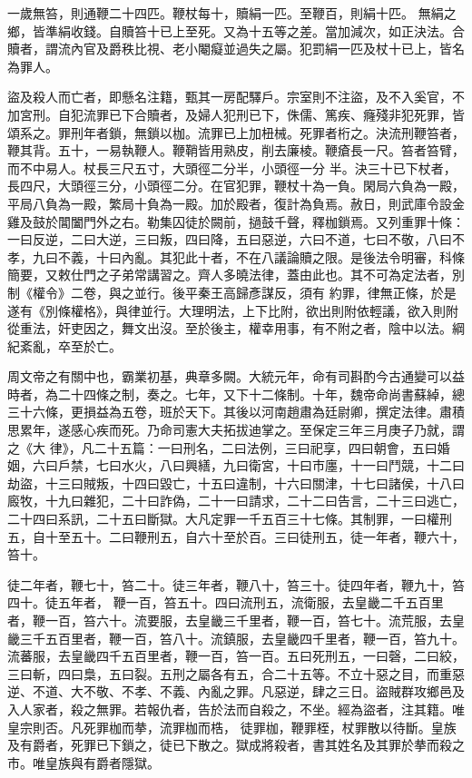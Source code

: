 \begin{pinyinscope}
 一歲無笞，則通鞭二十四匹。鞭杖每十，贖絹一匹。至鞭百，則絹十匹。
 無絹之鄉，皆準絹收錢。自贖笞十已上至死。又為十五等之差。當加減次，如正決法。合贖者，謂流內官及爵秩比視、老小閹癡並過失之屬。犯罰絹一匹及杖十已上，皆名為罪人。



 盜及殺人而亡者，即懸名注籍，甄其一房配驛戶。宗室則不注盜，及不入奚官，不加宮刑。自犯流罪已下合贖者，及婦人犯刑已下，侏儒、篤疾、癃殘非犯死罪，皆頌系之。罪刑年者鎖，無鎖以枷。流罪已上加杻械。死罪者桁之。決流刑鞭笞者，鞭其背。五十，一易執鞭人。鞭鞘皆用熟皮，削去廉棱。鞭瘡長一尺。笞者笞臂，而不中易人。杖長三尺五寸，大頭徑二分半，小頭徑一分
 半。決三十已下杖者，長四尺，大頭徑三分，小頭徑二分。在官犯罪，鞭杖十為一負。閑局六負為一殿，平局八負為一殿，繁局十負為一殿。加於殿者，復計為負焉。赦日，則武庫令設金雞及鼓於閶闔門外之右。勒集囚徒於闕前，撾鼓千聲，釋枷鎖焉。又列重罪十條：一曰反逆，二曰大逆，三曰叛，四曰降，五曰惡逆，六曰不道，七曰不敬，八曰不孝，九曰不義，十曰內亂。其犯此十者，不在八議論贖之限。是後法令明審，科條簡要，又敕仕門之子弟常講習之。齊人多曉法律，蓋由此也。其不可為定法者，別制《權令》二卷，與之並行。後平秦王高歸彥謀反，須有
 約罪，律無正條，於是遂有《別條權格》，與律並行。大理明法，上下比附，欲出則附依輕議，欲入則附從重法，奸吏因之，舞文出沒。至於後主，權幸用事，有不附之者，陰中以法。綱紀紊亂，卒至於亡。



 周文帝之有關中也，霸業初基，典章多闕。大統元年，命有司斟酌今古通變可以益時者，為二十四條之制，奏之。七年，又下十二條制。十年，魏帝命尚書蘇綽，總三十六條，更損益為五卷，班於天下。其後以河南趙肅為廷尉卿，撰定法律。肅積思累年，遂感心疾而死。乃命司憲大夫拓拔迪掌之。至保定三年三月庚子乃就，謂之《大
 律》，凡二十五篇：一曰刑名，二曰法例，三曰祀享，四曰朝會，五曰婚姻，六曰戶禁，七曰水火，八曰興繕，九曰衛宮，十曰市廛，十一曰鬥競，十二曰劫盜，十三曰賊叛，十四曰毀亡，十五曰違制，十六曰關津，十七曰諸侯，十八曰廄牧，十九曰雜犯，二十曰詐偽，二十一曰請求，二十二曰告言，二十三曰逃亡，二十四曰系訊，二十五曰斷獄。大凡定罪一千五百三十七條。其制罪，一曰權刑五，自十至五十。二曰鞭刑五，自六十至於百。三曰徒刑五，徒一年者，鞭六十，笞十。



 徒二年者，鞭七十，笞二十。徒三年者，鞭八十，笞三十。徒四年者，鞭九十，笞四十。徒五年者，
 鞭一百，笞五十。四曰流刑五，流衛服，去皇畿二千五百里者，鞭一百，笞六十。流要服，去皇畿三千里者，鞭一百，笞七十。流荒服，去皇畿三千五百里者，鞭一百，笞八十。流鎮服，去皇畿四千里者，鞭一百，笞九十。流蕃服，去皇畿四千五百里者，鞭一百，笞一百。五曰死刑五，一曰磬，二曰絞，三曰斬，四曰梟，五曰裂。五刑之屬各有五，合二十五等。不立十惡之目，而重惡逆、不道、大不敬、不孝、不義、內亂之罪。凡惡逆，肆之三日。盜賊群攻鄉邑及入人家者，殺之無罪。若報仇者，告於法而自殺之，不坐。經為盜者，注其籍。唯皇宗則否。凡死罪枷而拲，流罪枷而梏，
 徒罪枷，鞭罪桎，杖罪散以待斷。皇族及有爵者，死罪已下鎖之，徒已下散之。獄成將殺者，書其姓名及其罪於拲而殺之市。唯皇族與有爵者隱獄。




\end{pinyinscope}
